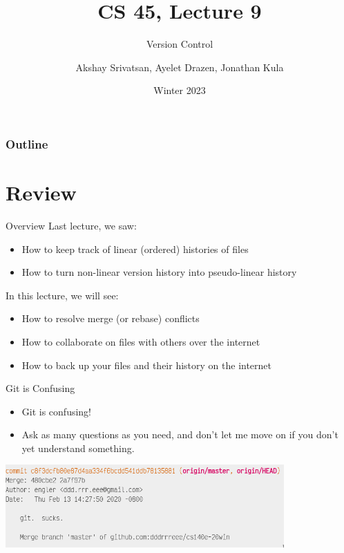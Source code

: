\usepackage{shared/cs45}
\usepackage{tikz}
\usepackage{multicol}
\usetikzlibrary{graphs}
\tikzset{>=latex}

\title{CS 45, Lecture 9}
\subtitle{Version Control}
\date{Winter 2023}
\author{Akshay Srivatsan, Ayelet Drazen, Jonathan Kula}

\newcommand{\var}[1]{\texttt{\$#1}}
\newcommand{\cmd}[1]{\texttt{#1}}



\maketitle

\frame{\titlepage}

\begin{frame}
  \frametitle{Outline}
  \tableofcontents[hidesubsections]
\end{frame}

\section{Review}

\begin{frame}{Overview}
  Last lecture, we saw:
  \begin{itemize}
    \item How to keep track of linear (ordered) histories of files
    \item How to turn non-linear version history into pseudo-linear history
  \end{itemize}
  \pause

  In this lecture, we will see:
  \begin{itemize}
    \item How to resolve merge (or rebase) conflicts
    \item How to collaborate on files with others over the internet
    \item How to back up your files and their history on the internet
  \end{itemize}
\end{frame}

\begin{frame}{Git is Confusing}
  \begin{itemize}
    \item Git is confusing!\pause
    \item Ask as many questions as you need, and don't let me move on if you
      don't yet understand something.\pause
  \end{itemize}
  \begin{center}
    \includegraphics[width=0.8\textwidth]{images/confusing.png}
  \end{center}
\end{frame}

